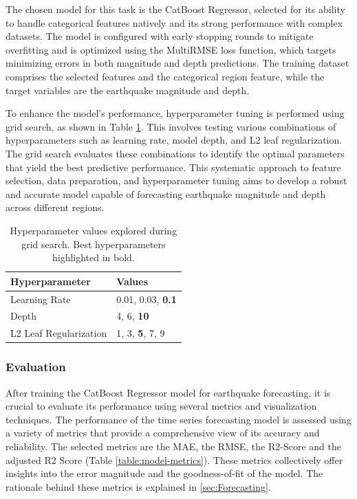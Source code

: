 The chosen model for this task is the CatBoost Regressor, selected for its
ability to handle categorical features natively and its strong performance
with complex datasets. The model is configured with early stopping rounds to
mitigate overfitting and is optimized using the MultiRMSE loss function, which
targets minimizing errors in both magnitude and depth predictions. The training
dataset comprises the selected features and the categorical region feature,
while the target variables are the earthquake magnitude and depth.

To enhance the model's performance, hyperparameter tuning is performed using
grid search, as shown in Table \ref{table:hyperparameters}. This involves
testing various combinations of hyperparameters
such as learning rate, model depth, and L2 leaf regularization. The grid
search evaluates these combinations to identify the optimal parameters that
yield the best predictive performance. This systematic approach to feature
selection, data preparation, and hyperparameter tuning aims to develop a
robust and accurate model capable of forecasting earthquake magnitude and
depth across different regions.

\begin{table}[h!]
  \centering
  \begin{tabular}{ll}
    \toprule
    \textbf{Hyperparameter} & \textbf{Values}          \\ \midrule
    Learning Rate           & 0.01, 0.03, \textbf{0.1} \\ \midrule
    Depth                   & 4, 6, \textbf{10}        \\ \midrule
    L2 Leaf Regularization  & 1, 3, \textbf{5}, 7, 9   \\ \bottomrule
  \end{tabular}
  \caption{Hyperparameter values explored during grid search. Best hyperparameters highlighted in bold.}
  \label{table:hyperparameters}
\end{table}

\subsubsection{Evaluation}
After training the CatBoost Regressor model for earthquake forecasting,
it is crucial to evaluate its performance using several metrics and visualization techniques.
The performance of the time series forecasting model is assessed using a variety of
metrics that provide a comprehensive view of its accuracy and reliability. The selected
metrics are the \ac{MAE}, the \ac{RMSE}, the R2-Score and the adjusted R2 Score
(Table \ref{table:model-metrics}).
These metrics collectively offer insights into the error magnitude and the goodness-of-fit
of the model. The rationale behind these metrics is explained in \ref{sec:Forecasting}.

